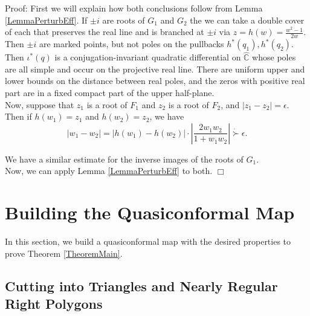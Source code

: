 \documentclass[12pt]{article}
\newcommand{\cc}{\mathbb{C}}
\begin{document}
\noindent Proof: First we will explain how both conclusions follow from Lemma \ref{LemmaPerturbEff}. If $\pm i$ are roots of $G_1$ and $G_2$ the we can take a double cover of each that preserves the real line and is branched at $\pm i$ via $z = h(w) = \frac{w^2 - 1}{2w}.$ Then $\pm i$ are marked points, but not poles on the pullbacks $h^*(q_1),h^*(q_2)$. Then $\iota^*(q)$ is a conjugation-invariant quadratic differential on $\hat{\cc}$ whose poles are all simple and occur on the projective real line. There are uniform upper and lower bounds on the distance between real poles, and the zeros with positive real part are in a fixed compact part of the upper half-plane.\\

\noindent Now, suppose that $z_1$ is a root of $F_1$ and $z_2$ is a root of $F_2$, and $|z_1 - z_2| = \epsilon.$ Then if $h(w_1) = z_1$ and $h(w_2) = z_2$, we have $$|w_1 - w_2| = |h(w_1) - h(w_2)| \cdot \left|\frac{2w_1w_2}{1 + w_1w_2}\right| \dot{\succ} \epsilon.$$

\noindent We have a similar estimate for the inverse images of the roots of $G_1$.\\

\noindent Now, we can apply Lemma \ref{LemmaPerturbEff} to both. $\Box$

\section{Building the Quasiconformal Map}

\noindent In this section, we build a quasiconformal map with the desired properties to prove Theorem \ref{TheoremMain}.

\subsection{Cutting into Triangles and Nearly Regular Right Polygons}
\end{document}
